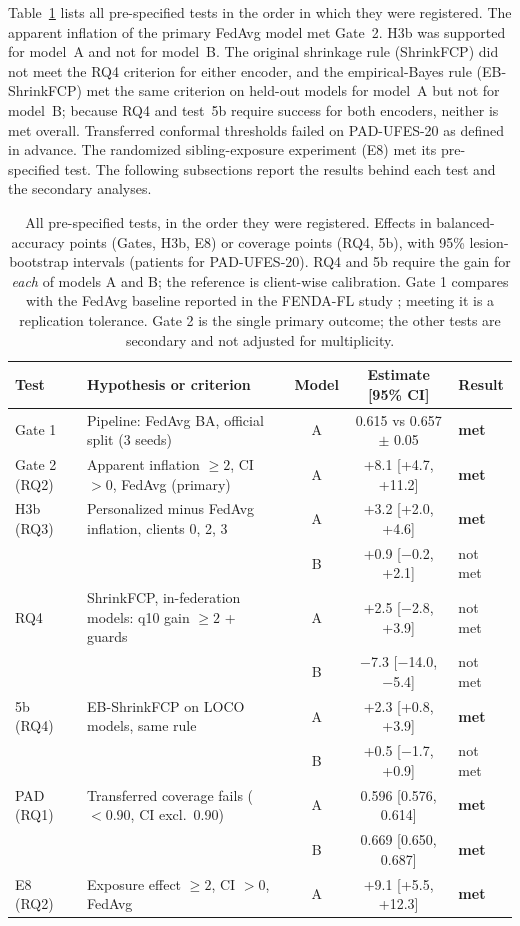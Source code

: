 \documentclass[VANCOUVER,Times1COL]{WileyNJDv5}
\begin{document}
Table~\ref{tab:scorecard} lists all pre-specified tests in the order in which they were registered. The
apparent inflation of the primary FedAvg model met Gate~2. H3b was supported for model~A and not for
model~B. The original shrinkage rule (ShrinkFCP) did not meet the RQ4 criterion for either encoder, and
the empirical-Bayes rule (EB-ShrinkFCP) met the same criterion on held-out models for model~A but not for
model~B; because RQ4 and test~5b require success for both encoders, neither is met overall. Transferred
conformal thresholds failed on PAD-UFES-20 as defined in advance. The randomized sibling-exposure experiment (E8) met its pre-specified test. The following subsections
report the results behind each test and the secondary analyses.

\begin{table}[!t]
\centering
\caption{All pre-specified tests, in the order they were registered. Effects in balanced-accuracy points
(Gates, H3b, E8) or coverage points (RQ4, 5b), with 95\% lesion-bootstrap intervals (patients for
PAD-UFES-20). RQ4 and 5b require the gain for \emph{each} of models A and B; the reference is client-wise
calibration. Gate 1 compares with the FedAvg baseline reported in the FENDA-FL study
\cite{tavakoli2024fendafl}; meeting it is a replication tolerance. Gate 2 is the single primary outcome;
the other tests are secondary and not adjusted for multiplicity.}
\label{tab:scorecard}
\begin{tabular}{@{}llccl@{}}
\toprule
Test & Hypothesis or criterion & Model & Estimate [95\% CI] & Result \\
\midrule
Gate 1 & Pipeline: FedAvg BA, official split (3 seeds) & A & 0.615 vs 0.657 $\pm$ 0.05 & \textbf{met} \\
Gate 2 (RQ2) & Apparent inflation $\ge 2$, CI $>0$, FedAvg (primary) & A & +8.1 [+4.7, +11.2] & \textbf{met} \\
H3b (RQ3) & Personalized minus FedAvg inflation, clients 0, 2, 3 & A & +3.2 [+2.0, +4.6] & \textbf{met} \\
 &  & B & +0.9 [$-$0.2, +2.1] & not met \\
RQ4 & ShrinkFCP, in-federation models: q10 gain $\ge 2$ + guards & A & +2.5 [$-$2.8, +3.9] & not met \\
 &  & B & $-$7.3 [$-$14.0, $-$5.4] & not met \\
5b (RQ4) & EB-ShrinkFCP on LOCO models, same rule & A & +2.3 [+0.8, +3.9] & \textbf{met} \\
 &  & B & +0.5 [$-$1.7, +0.9] & not met \\
PAD (RQ1) & Transferred coverage fails ($<0.90$, CI excl.\ 0.90) & A & 0.596 [0.576, 0.614] & \textbf{met} \\
 &  & B & 0.669 [0.650, 0.687] & \textbf{met} \\
E8 (RQ2) & Exposure effect $\ge 2$, CI $>0$, FedAvg & A & +9.1 [+5.5, +12.3] & \textbf{met} \\
\bottomrule
\end{tabular}
\end{table}
\end{document}
